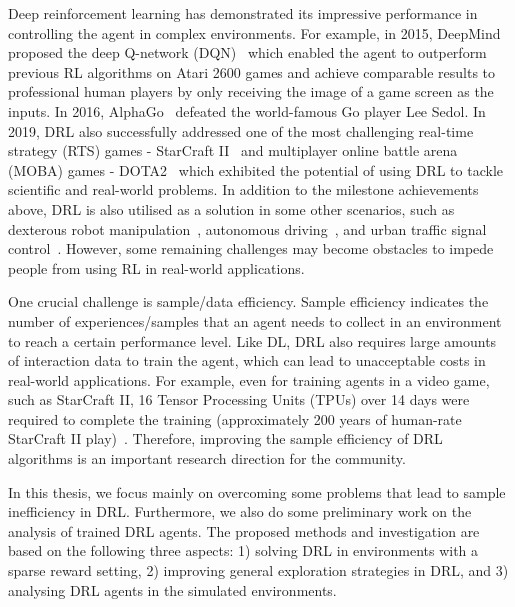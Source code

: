 Deep reinforcement learning has demonstrated its impressive performance in controlling the agent in complex environments. For example, in 2015, DeepMind proposed the deep Q-network (DQN)~\cite{mnih2015human} which enabled the agent to outperform previous RL algorithms on Atari 2600 games and achieve comparable results to professional human players by only receiving the image of a game screen as the inputs. In 2016, AlphaGo~\cite{silver2016mastering} defeated the world-famous Go player Lee Sedol. In 2019, DRL also successfully addressed one of the most challenging real-time strategy (RTS) games - StarCraft II~\cite{vinyals2019grandmaster} and multiplayer online battle arena (MOBA) games - DOTA2~\cite{berner2019dota} which exhibited the potential of using DRL to tackle scientific and real-world problems. In addition to the milestone achievements above, DRL is also utilised as a solution in some other scenarios, such as dexterous robot manipulation~\cite{andrychowicz2020learning}, autonomous driving~\cite{kiran2021deep}, and urban traffic signal control~\cite{wu2020multi}. However, some remaining challenges may become obstacles to impede people from using RL in real-world applications. 

One crucial challenge is sample/data efficiency. Sample efficiency indicates the number of experiences/samples that an agent needs to collect in an environment to reach a certain performance level. Like DL, DRL also requires large amounts of interaction data to train the agent, which can lead to unacceptable costs in real-world applications. For example, even for training agents in a video game, such as StarCraft II, 16 Tensor Processing Units (TPUs) over 14 days were required to complete the training (approximately 200 years of human-rate StarCraft II play)~\cite{vinyals2019grandmaster}. Therefore, improving the sample efficiency of DRL algorithms is an important research direction for the community. 

In this thesis, we focus mainly on overcoming some problems that lead to sample inefficiency in DRL. Furthermore, we also do some preliminary work on the analysis of trained DRL agents. The proposed methods and investigation are based on the following three aspects: 1) solving DRL in environments with a sparse reward setting, 2) improving general exploration strategies in DRL, and 3) analysing DRL agents in the simulated environments.
\newpage

